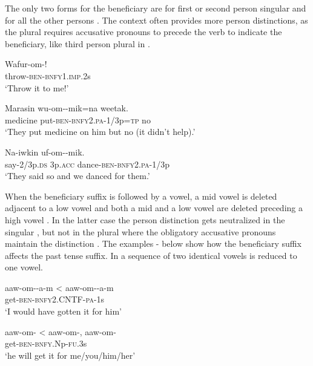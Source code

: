 The only two forms for the beneficiary are \textstyleEmphasizedVernacularWords{\nobreakdash-} for first or second person singular  and \textstyleEmphasizedVernacularWords{\nobreakdash-} for all the other persons . The context often provides more person distinctions, as the plural requires accusative pronouns to precede the verb to indicate the beneficiary, like third person plural in . 

\ea%
\label{ex:3:x225}
\gll Wafur-om-! \\
throw-\textsc{ben}-\textsc{bnfy}1.\textsc{imp}.2s \\
\glt`Throw it to me!' 
\z

\ea%
\label{ex:3:x226}
\gll Marasin wu-om--mik=na weetak. \\
medicine put-\textsc{ben}-\textsc{bnfy}2.\textsc{pa}-1/3p=\textsc{tp} no \\
\glt`They put medicine on him but no (it didn't help).'
\z

\ea%
\label{ex:3:x227}
\gll Na-iwkin  uf-om--mik. \\
say-2/3p.\textsc{ds} 3p.\textsc{acc} dance-\textsc{ben}-\textsc{bnfy}2.\textsc{pa}-1/3p \\
\glt`They said so and we danced for them.'
\z

When the beneficiary suffix is followed by a vowel, a mid vowel is deleted adjacent to a low vowel  and both a mid and a low vowel are deleted preceding a high vowel . In the latter case the person distinction gets neutralized in the singular , but not in the plural where the obligatory accusative pronouns maintain the distinction . The examples - below show how the beneficiary suffix affects the past tense suffix. In  a sequence of two identical vowels is reduced to one vowel.

\ea%
\label{ex:3:x228}
\gll aaw-om--a-m {{\textless} aaw-om}--a-m \\
get-\textsc{ben}-\textsc{bnfy}2.CNTF-\textsc{pa}-1s \\
\glt`I would have gotten it for him' 
\z

\ea%
\label{ex:3:x444}
\gll aaw-om- {{\textless} aaw-om-}, aaw-om- \\
get-\textsc{ben}-\textsc{bnfy}.Np-\textsc{fu}.3s\\
\glt`he will get it for me/you/him/her'
\z

